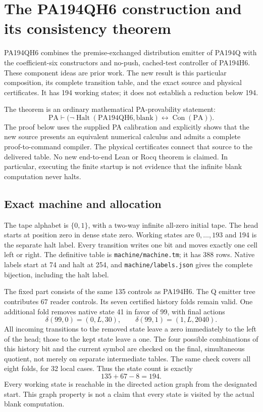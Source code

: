 \section{The PA194QH6 construction and its consistency theorem}
\label{sec:qh6-preservation}

PA194QH6 combines the premise-exchanged distribution emitter of PA194Q
with the coefficient-six constructors and no-push, cached-test controller
of PA194H6. These component ideas are prior work. The new result is this
particular composition, its complete transition table, and the exact source
and physical certificates. It has 194 working states; it does not establish
a reduction below 194.

The theorem is an ordinary mathematical PA-provability statement:
\[
 \mathrm{PA}\vdash
 \bigl(\neg\operatorname{Halt}(\mathrm{PA194QH6},\mathrm{blank})
       \leftrightarrow\operatorname{Con}(\mathrm{PA})\bigr).
 \tag{QH6}
\]
The proof below uses the supplied PA calibration and explicitly shows that
the new source presents an equivalent numerical calculus and admits a
complete proof-to-command compiler. The physical certificates connect that
source to the delivered table. No new end-to-end Lean or Rocq theorem is
claimed. In particular, executing the finite startup is not evidence that
the infinite blank computation never halts.

\subsection{Exact machine and allocation}

The tape alphabet is $\{0,1\}$, with a two-way infinite all-zero initial
tape. The head starts at position zero in dense state zero. Working states
are $0,\ldots,193$ and 194 is the separate halt label. Every transition
writes one bit and moves exactly one cell left or right. The definitive
table is \texttt{machine/machine.tm}; it has 388 rows. Native labels start
at 74 and halt at 254, and \texttt{machine/labels.json} gives the complete
bijection, including the halt label.

The fixed part consists of the same 135 controls as PA194H6. The Q emitter
tree contributes 67 reader controls. Its seven certified history folds
remain valid. One additional fold removes native state 41 in favor of 99,
with final actions
\[
 \delta(99,0)=(0,L,30),\qquad
 \delta(99,1)=(1,L,2040).
\]
All incoming transitions to the removed state leave a zero immediately
to the left of the head; those to the kept state leave a one. The four
possible combinations of this history bit and the current symbol are
checked on the final, simultaneous quotient, not merely on separate
intermediate tables. The same check covers all eight folds, for 32 local
cases. Thus the state count is exactly
\[
                         135+67-8=194.
\]
Every working state is reachable in the directed action graph from the
designated start. This graph property is not a claim that every state is
visited by the actual blank computation.

